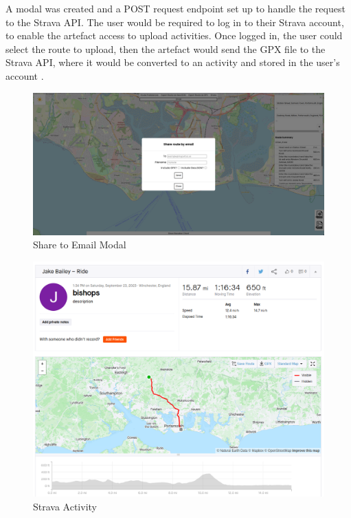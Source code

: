 A modal was created  and a POST request endpoint set up to handle the request to the Strava API. The user would be required to log in to their Strava account, to enable the artefact access to upload activities. Once logged in, the user could select the route to upload, then the artefact would send the GPX file to the Strava API, where it would be converted to an activity and stored in the user's account .

\begin{figure}[!ht]
  \centering
  \includegraphics[width=425px]{figures/Progress Images/Iteration-2/SR17/SR17png.png}
  \caption{Share to Email Modal}
  \label{fig:share-email-modal}
\end{figure}

\begin{figure}[!ht]
  \centering
  \includegraphics[width=425px]{figures/Progress Images/Iteration-2/SR18/SR18 Upload Example 1.png}
  \caption{Strava Activity}
  \label{fig:strava-example}
\end{figure}

